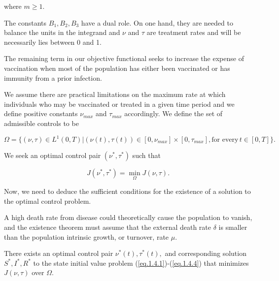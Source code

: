 where $m \geq 1$.

The constants $B_1,B_2,B_3$ have a dual role. On one hand, they are needed to balance the units in the integrand and $\nu$ and $\tau$ are treatment rates and will be necessarily lies between 0 and 1.

The remaining term in our objective functional seeks to increase the expense of vaccination when most of the population has either been vaccinated or has immunity from a prior infection.

We assume there are practical limitations on the maximum rate at which individuals who may be vaccinated or treated in a given time period and we define positive constants $\nu_{max}$ and $\tau_{max}$ accordingly.
We define the set of admissible controls to be 

\begin{equation}\label{eq.1.4.6}
\Omega =\{(\nu,\tau)\in L^1(0,T) |  (\nu (t), \tau (t))\in [0,\nu_{max}]\times [0,\tau_{max}], \mbox{for every}\, t\in [0,T]\}.
\end{equation}

We seek an optimal control pair $(\nu^*,\tau^*)$ such that

\begin{equation}\label{eq.1.4.7}
J(\nu^*,\tau^*)=\min_{\Omega}J(\nu,\tau).
\end{equation}

Now, we need to deduce the sufficient conditions for the existence of a solution to the optimal control problem.

A high death rate from disease could theoretically cause the population to vanish, and the existence theorem must assume that the external death rate $\delta$ is smaller than the population intrinsic growth, or turnover, rate $\mu$.

\begin{theorem}\label{Teo.Ex.Ap}
There exists an optimal control pair $\nu^*(t),\tau^*(t),$ and corresponding solution $S^*,I^*,R^*$ to the state initial value problem (\ref{eq.1.4.1})-(\ref{eq.1.4.4}) that minimizes $J(\nu,\tau)$ over $\Omega$.
\end{theorem}

